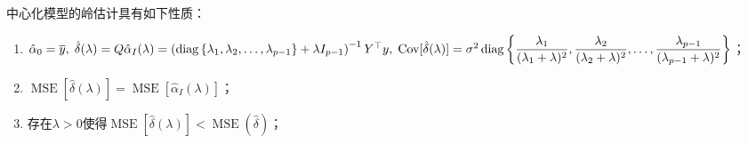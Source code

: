 \begin{property}\label{prop:RidgeEstimate}
	中心化模型的岭估计具有如下性质：
	\begin{enumerate}
		\item $\hat{\alpha}_0=\overline{y},\;\hat{\delta}(\lambda)=Q\hat{\alpha}_I(\lambda)=\left(\operatorname{diag}\left\{\lambda_1, \lambda_2, \dots, \lambda_{p-1}\right\}+\lambda I_{p-1}\right)^{-1}Y^{\top}y,\;\operatorname{Cov}[\hat{\delta}(\lambda)]=\sigma^2\operatorname{diag}\left\{\dfrac{\lambda_1}{(\lambda_1+\lambda)^2},\dfrac{\lambda_2}{(\lambda_2+\lambda)^2},\dots,\dfrac{\lambda_{p-1}}{(\lambda_{p-1}+\lambda)^2}\right\}$；
		\item $\operatorname{MSE}[\hat{\delta}(\lambda)]=\operatorname{MSE}[\hat{\alpha}_I(\lambda)]$；
		\item 存在$\lambda>0$使得$\operatorname{MSE}[\hat{\delta}(\lambda)]<\operatorname{MSE}(\hat{\delta})$；
	\end{enumerate}
\end{property}
